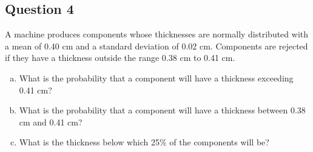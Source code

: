 \documentclass[]{report}
\begin{document}

\subsection*{Question 4}
A machine produces components whose thicknesses are normally
distributed with a mean of 0.40 cm and a standard deviation of 0.02 cm.
Components are rejected if they have a thickness outside the range 0.38 cm
to 0.41 cm.
\begin{enumerate}[(a)]
	\item What is the probability that a component will have a thickness
	exceeding 0.41 cm? 
	\item What is the probability that a component will have a thickness between
	0.38 cm and 0.41 cm?
	\item What is the thickness below which 25\% of the components will be?
\end{enumerate}
\end{document}
